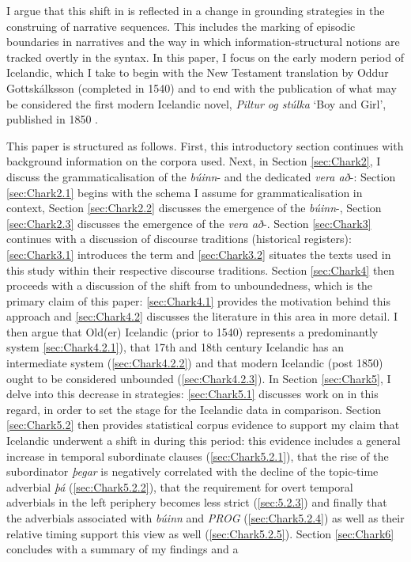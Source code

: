 \documentclass[output=paper,colorlinks,citecolor=brown]{langscibook}
\begin{document}
I argue that this shift in  is reflected in a change in grounding strategies in the construing of narrative sequences. This includes the marking of episodic boundaries in narratives and the way in which information-structural notions are tracked overtly in the syntax. In this paper, I focus on the early modern period of Icelandic, which I take to begin with the New Testament translation by Oddur Gottskálksson (completed in 1540) and to end with the publication of what may be considered the first modern Icelandic novel, \textit{Piltur og stúlka} `Boy and Girl', published in 1850 \citep{bernhardhsson2017jon, bernhardhsson2018spreading}. %

This paper is structured as follows. First, this introductory section continues with background information on the corpora used. Next, in Section \ref{sec:Chark2}, I discuss the grammaticalisation of the \textit{búinn}-  and the dedicated \textit{vera að}-: Section \ref{sec:Chark2.1} begins with the schema I assume for grammaticalisation in context, Section \ref{sec:Chark2.2} discusses the emergence of the \textit{búinn}-, Section \ref{sec:Chark2.3} discusses the emergence of the \textit{vera að}-. Section \ref{sec:Chark3} continues with a discussion of discourse traditions (historical registers): \ref{sec:Chark3.1} introduces the term and \ref{sec:Chark3.2} situates the texts used in this study within their respective discourse traditions. Section \ref{sec:Chark4} then proceeds with a discussion of the shift from  to unboundedness, which is the primary claim of this paper: \ref{sec:Chark4.1} provides the motivation behind this approach and \ref{sec:Chark4.2} discusses the literature in this area in more detail. I then argue that Old(er) Icelandic (prior to 1540) represents a predominantly  system \ref{sec:Chark4.2.1}), that 17th and 18th century Icelandic has an intermediate system (\ref{sec:Chark4.2.2}) and that modern Icelandic (post 1850) ought to be considered unbounded (\ref{sec:Chark4.2.3}). In Section \ref{sec:Chark5}, I delve into this decrease in  strategies: \ref{sec:Chark5.1} discusses work on  in this regard, in order to set the stage for the Icelandic data in comparison. Section \ref{sec:Chark5.2} then provides statistical corpus evidence to support my claim that Icelandic underwent a shift in  during this period: this evidence includes a general increase in temporal subordinate clauses (\ref{sec:Chark5.2.1}), that the rise of the subordinator \textit{þegar} is negatively correlated with the decline of the topic-time adverbial \textit{þá} (\ref{sec:Chark5.2.2}), that the requirement for overt temporal adverbials in the left periphery becomes less strict (\ref{sec:5.2.3}) and finally that the adverbials associated with \textit{búinn} and \textit{PROG} (\ref{sec:Chark5.2.4}) as well as their relative timing support this view as well (\ref{sec:Chark5.2.5}). Section \ref{sec:Chark6} concludes with a summary of my findings and a 
\end{document}
